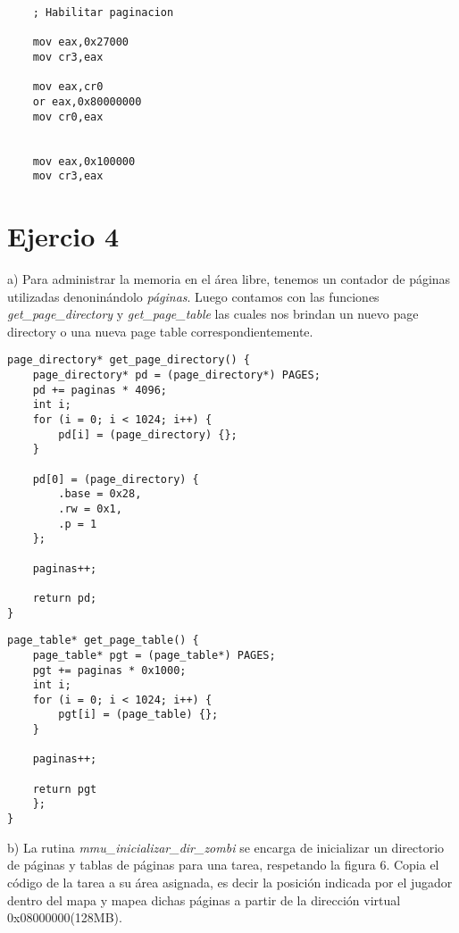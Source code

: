 \documentclass[a4paper]{article}
\begin{document}
\begin{codesnippet}
\begin{verbatim}
    ; Habilitar paginacion

    mov eax,0x27000
    mov cr3,eax

    mov eax,cr0
    or eax,0x80000000
    mov cr0,eax


    mov eax,0x100000
    mov cr3,eax
\end{verbatim}
\end{codesnippet}

\newpage
\section{Ejercio 4}
{\large a)} Para administrar la memoria en el área libre, tenemos un contador de páginas utilizadas denoninándolo \textit{páginas}. Luego contamos con las funciones \textit{get_page_directory} y \textit{get_page_table} las cuales nos brindan un nuevo page directory o una nueva page table correspondientemente.


\begin{codesnippet}
\begin{verbatim}
page_directory* get_page_directory() {
    page_directory* pd = (page_directory*) PAGES;
    pd += paginas * 4096;
    int i;
    for (i = 0; i < 1024; i++) {
        pd[i] = (page_directory) {};
    }

    pd[0] = (page_directory) {
        .base = 0x28,
        .rw = 0x1,
        .p = 1
    };

    paginas++;

    return pd;
}
\end{verbatim}
\end{codesnippet}


\begin{codesnippet}
\begin{verbatim}
page_table* get_page_table() {
    page_table* pgt = (page_table*) PAGES;
    pgt += paginas * 0x1000;
    int i;
    for (i = 0; i < 1024; i++) {
        pgt[i] = (page_table) {};
    }

    paginas++;

    return pgt
    };
}
\end{verbatim}
\end{codesnippet}
{\large b)} La rutina \textit{mmu_inicializar_dir_zombi} se encarga de inicializar un directorio
de p\'aginas y tablas de p\'aginas para una tarea, respetando la figura 6. Copia
el c\'odigo de la tarea a su \'area asignada, es decir la posici\'on indicada por el jugador dentro
del mapa y mapea dichas p\'aginas a partir de la direcci\'on virtual 0x08000000(128MB).
\end{document}
